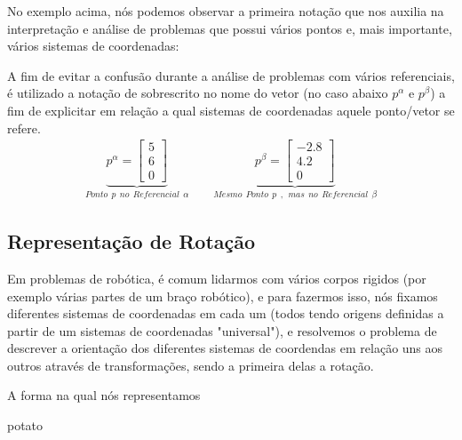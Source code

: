 \documentclass{article}
\begin{document}
            No exemplo acima, nós podemos observar a primeira notação que nos auxilia na interpretação e análise de problemas que possui vários pontos e, mais importante, vários sistemas de coordenadas:
            \begin{note}
                A fim de evitar a confusão durante a análise de problemas com vários referenciais, é utilizado a notação de sobrescrito no nome do vetor (no caso abaixo $p^\alpha$ e $p^\beta$) a fim de explicitar em relação a qual sistemas de coordenadas aquele ponto/vetor se refere.
                \begin{align*}
                    \underbrace{p^\alpha = \begin{bmatrix}
                        5 \\ 
                        6 \\
                        0
                    \end{bmatrix}}_{Ponto \ \ p \ \ no \ \ Referencial \ \  \alpha} \ \ \ \ \ \ \ \ \ 
                    \underbrace{p^\beta = \begin{bmatrix}
                        -2.8 \\ 
                        4.2 \\
                        0
                    \end{bmatrix}}_{Mesmo \ \ Ponto \ \ p \ \ , \ \ mas \ \ no \ \ Referencial \ \  \beta}
            \end{align*}            \end{note}

        \subsection{Representação de Rotação}
            Em problemas de robótica, é comum lidarmos com vários corpos rigidos (por exemplo várias partes de um braço robótico), e para fazermos isso, nós fixamos diferentes sistemas de coordenadas em cada um (todos tendo origens definidas a partir de um sistemas de coordenadas "universal"), e resolvemos o problema de descrever a orientação dos diferentes sistemas de coordendas em relação uns aos outros através de transformações, sendo a primeira delas a rotação.

            A forma na qual nós representamos 
    \newpage
    \begin{note}
        potato
    \end{note}
\end{document}
